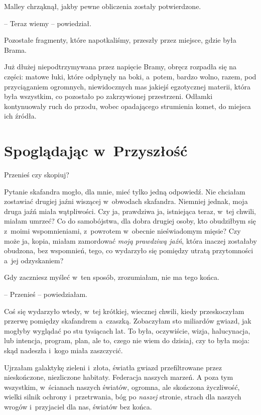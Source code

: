 \documentclass[oneside,polish,11pt,sfheadings]{mwbk}
\begin{document}
Malley chrząknął, jakby pewne obliczenia zostały potwierdzone.

-- Teraz wiemy -- powiedział.

Pozostałe fragmenty, które napotkaliśmy, przeszły przez miejsce, gdzie
była Brama.

Już dłużej niepodtrzymywana przez napięcie Bramy, obręcz rozpadła się na
części: matowe łuki, które odpłynęły na boki, a~potem, bardzo wolno,
razem, pod przyciąganiem ogromnych, niewidocznych mas jakiejś
egzotycznej materii, która była wszystkim, co pozostało po zakrzywionej
przestrzeni. Odłamki kontynuowały ruch do przodu, wobec opadającego
strumienia komet, do miejsca ich źródła.



\chapter{Spoglądając w~Przyszłość}

Przenieś czy skopiuj?

Pytanie skafandra mogło, dla mnie, mieć tylko jedną odpowiedź. Nie
chciałam zostawiać drugiej jaźni wiszącej w~obwodach skafandra. Niemniej
jednak, moja druga jaźń miała wątpliwości. Czy ja, prawdziwa ja,
istniejąca teraz, w~tej chwili, miałam umrzeć? Co do samobójstwa, dla
dobra drugiej osoby, kto obudziłbym się z~moimi wspomnieniami, z~powrotem w~obecnie nieświadomym mięsie? Czy może ja, kopia, miałam
zamordować \textit{moją prawdziwą jaźń}, która inaczej zostałaby obudzona,
bez wspomnień, tego, co wydarzyło się pomiędzy utratą przytomności a~jej
odzyskaniem?

Gdy zaczniesz myśleć w~ten sposób, zrozumiałam, nie ma tego końca.

-- Przenieś -- powiedziałam.

Coś się wydarzyło wtedy, w~tej krótkiej, wiecznej chwili, kiedy
przeskoczyłam przerwę pomiędzy skafandrem a~czaszką. Zobaczyłam sto
miliardów gwiazd, jak mogłyby wyglądać po stu tysiącach lat. To była,
oczywiście, wizja, halucynacja, lub intencja, program, plan, ale to,
czego nie wiem do dzisiaj, czy to była moja: skąd nadeszła i~kogo miała
zaszczycić.

Ujrzałam galaktykę zieleni i~złota, światła gwiazd przefiltrowane przez
nieskończone, niezliczone habitaty. Federacja naszych marzeń. A poza tym
wszystkim, w~ścianach naszych światów, ogromna, ale skończona
życzliwość, wielki silnik ochrony i~przetrwania, bóg po \textit{naszej}
stronie, strach dla naszych wrogów i~przyjaciel dla nas, światów bez
końca.
\end{document}
